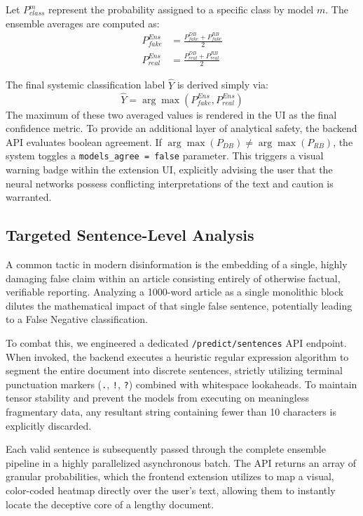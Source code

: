 \documentclass[conference]{IEEEtran}
\begin{document}
Let $P_{class}^{m}$ represent the probability assigned to a specific class by model $m$. The ensemble averages are computed as:
\begin{align}
P_{fake}^{Ens} &= \frac{P_{fake}^{DB} + P_{fake}^{RB}}{2} \\
P_{real}^{Ens} &= \frac{P_{real}^{DB} + P_{real}^{RB}}{2}
\end{align}

The final systemic classification label $\hat{Y}$ is derived simply via:
\begin{equation}
\hat{Y} = \arg\max \left(P_{fake}^{Ens}, P_{real}^{Ens}\right)
\end{equation}
The maximum of these two averaged values is rendered in the UI as the final confidence metric. To provide an additional layer of analytical safety, the backend API evaluates boolean agreement. If $\arg\max(P_{DB}) \neq \arg\max(P_{RB})$, the system toggles a \texttt{models\_agree = false} parameter. This triggers a visual warning badge within the extension UI, explicitly advising the user that the neural networks possess conflicting interpretations of the text and caution is warranted.

\subsection{Targeted Sentence-Level Analysis}
A common tactic in modern disinformation is the embedding of a single, highly damaging false claim within an article consisting entirely of otherwise factual, verifiable reporting. Analyzing a 1000-word article as a single monolithic block dilutes the mathematical impact of that single false sentence, potentially leading to a False Negative classification.

To combat this, we engineered a dedicated \texttt{/predict/sentences} API endpoint. When invoked, the backend executes a heuristic regular expression algorithm to segment the entire document into discrete sentences, strictly utilizing terminal punctuation markers (\texttt{.}, \texttt{!}, \texttt{?}) combined with whitespace lookaheads. To maintain tensor stability and prevent the models from executing on meaningless fragmentary data, any resultant string containing fewer than 10 characters is explicitly discarded. 

Each valid sentence is subsequently passed through the complete ensemble pipeline in a highly parallelized asynchronous batch. The API returns an array of granular probabilities, which the frontend extension utilizes to map a visual, color-coded heatmap directly over the user's text, allowing them to instantly locate the deceptive core of a lengthy document.
\end{document}
